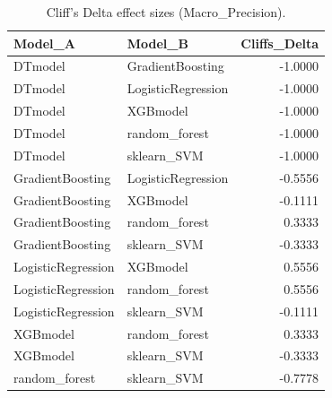 \begin{table}[t]
\centering
\begin{tabular}{llr}
\toprule
Model_A & Model_B & Cliffs_Delta \\
\midrule
DTmodel & GradientBoosting & -1.0000 \\
DTmodel & LogisticRegression & -1.0000 \\
DTmodel & XGBmodel & -1.0000 \\
DTmodel & random_forest & -1.0000 \\
DTmodel & sklearn_SVM & -1.0000 \\
GradientBoosting & LogisticRegression & -0.5556 \\
GradientBoosting & XGBmodel & -0.1111 \\
GradientBoosting & random_forest & 0.3333 \\
GradientBoosting & sklearn_SVM & -0.3333 \\
LogisticRegression & XGBmodel & 0.5556 \\
LogisticRegression & random_forest & 0.5556 \\
LogisticRegression & sklearn_SVM & -0.1111 \\
XGBmodel & random_forest & 0.3333 \\
XGBmodel & sklearn_SVM & -0.3333 \\
random_forest & sklearn_SVM & -0.7778 \\
\bottomrule
\end{tabular}
\caption{Cliff's Delta effect sizes (Macro_Precision).}
\label{tab:cliffs_Macro_Precision}
\end{table}